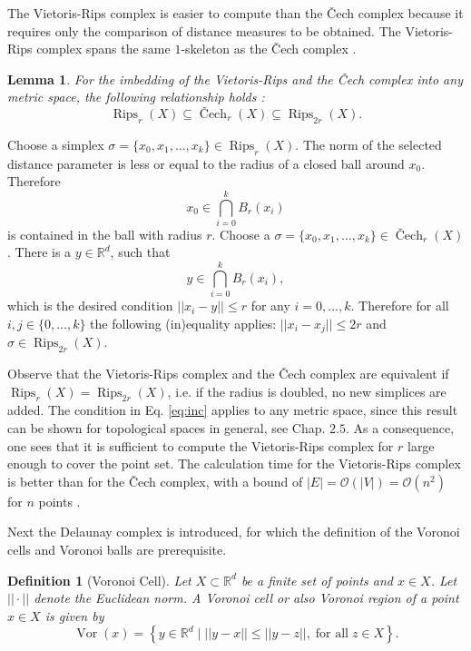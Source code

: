 \documentclass[journal]{IEEEtran}
\DeclareMathOperator{\Cech}{\text{\v{C}ech}}
\DeclareMathOperator{\Rips}{Rips}
\DeclareMathOperator{\Vor}{Vor}
\newtheorem{definition}{Definition}[section]
\newtheorem{lemma}{Lemma}[definition]
\begin{document}
The Vietoris-Rips complex is easier to compute than the \v{C}ech complex because it requires only the comparison of distance measures to be obtained. The Vietoris-Rips complex spans the same $1$-skeleton as the \v{C}ech complex \cite{boissonnat2018geometric}.

\begin{lemma}
For the imbedding of the Vietoris-Rips and the \v{C}ech complex into any metric space, the following relationship holds  \cite{boissonnat2018geometric}:
\begin{equation}
\label{eq:inc}
\Rips_r(X)\subseteq \Cech_r(X) \subseteq \Rips_{2r}(X).
\end{equation}
\end{lemma}

\begin{IEEEproof}
Choose a simplex $\sigma = \{x_0,x_1,\ldots,x_k\} \in \Rips_r(X)$. The norm of the selected distance parameter is less or equal to the radius of a closed ball around $x_0$. Therefore
\[
x_0 \in \bigcap_{i=0}^{k}B_r(x_i)
\] is contained in the ball with radius $r$. Choose a $\sigma = \{x_0,x_1,\ldots,x_k\} \in \Cech_r(X)$. There is a $y \in \mathbb{R}^d$, such that
\[
y \in \bigcap_{i=0}^{k}B_r(x_i),
\] which is the desired condition $||x_i-y|| \leq r$ for any $i = 0,\ldots,k$. Therefore for all $i,j \in \{0,\ldots,k\}$ the following (in)equality applies: $||x_i-x_j|| \leq 2r$ and $\sigma \in \Rips_{2r}(X)$.
\end{IEEEproof}

Observe that the Vietoris-Rips complex and the \v{C}ech complex are equivalent if $\Rips_{r}(X) = \Rips_{2r}(X)$, i.e. if the radius is doubled, no new simplices are added. The condition in Eq. \ref{eq:inc} applies to any metric space, since this result can be shown for topological spaces in general, see \cite{boissonnat2018geometric} Chap. $2.5$. As a consequence, one sees that it is sufficient to compute the Vietoris-Rips complex for $r$ large enough to cover the point set. The calculation time for the Vietoris-Rips complex is better than for the \v{C}ech complex, with a bound of $|E| = \mathcal{O}(|V|) = \mathcal{O}(n^2)$ for $n$ points \cite{Zomorodian10}.

Next the Delaunay complex is introduced, for which the definition of the Voronoi cells and Voronoi balls are prerequisite.



\begin{definition}[Voronoi Cell]
Let $X \subset \mathbb{R}^d$ be a finite set of points and $x \in X$. Let $|| \cdot ||$ denote the Euclidean norm. A Voronoi cell or also Voronoi region of a point $x \in X$ is given by
\[
\Vor(x) = \left\{ y \in \mathbb{R}^d \; \bigg\vert \; ||y-x|| \leq ||y-z||, \; \text{for all} \; z \in X \right\}.
\]
\end{definition}
\end{document}
